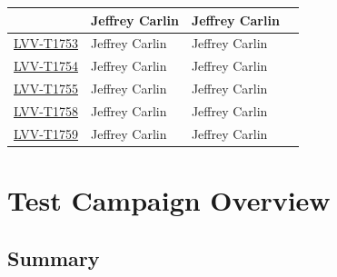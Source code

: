 \documentclass[DM,lsstdraft,STR,toc]{lsstdoc}
\begin{document}
\begin{longtable}{p{3cm}p{3cm}p{3cm}p{6cm}}
& {\small Jeffrey Carlin } & {\small Jeffrey Carlin } &
\begin{minipage}[]{6cm}
\smallskip
{\small  }
\medskip
\end{minipage}
\\ \hline
\href{https://jira.lsstcorp.org/secure/Tests.jspa#/testCase/LVV-T1753}{LVV-T1753}
& {\small Jeffrey Carlin } & {\small Jeffrey Carlin } &
\begin{minipage}[]{6cm}
\smallskip
{\small  }
\medskip
\end{minipage}
\\ \hline
\href{https://jira.lsstcorp.org/secure/Tests.jspa#/testCase/LVV-T1754}{LVV-T1754}
& {\small Jeffrey Carlin } & {\small Jeffrey Carlin } &
\begin{minipage}[]{6cm}
\smallskip
{\small  }
\medskip
\end{minipage}
\\ \hline
\href{https://jira.lsstcorp.org/secure/Tests.jspa#/testCase/LVV-T1755}{LVV-T1755}
& {\small Jeffrey Carlin } & {\small Jeffrey Carlin } &
\begin{minipage}[]{6cm}
\smallskip
{\small  }
\medskip
\end{minipage}
\\ \hline
\href{https://jira.lsstcorp.org/secure/Tests.jspa#/testCase/LVV-T1758}{LVV-T1758}
& {\small Jeffrey Carlin } & {\small Jeffrey Carlin } &
\begin{minipage}[]{6cm}
\smallskip
{\small  }
\medskip
\end{minipage}
\\ \hline
\href{https://jira.lsstcorp.org/secure/Tests.jspa#/testCase/LVV-T1759}{LVV-T1759}
& {\small Jeffrey Carlin } & {\small Jeffrey Carlin } &
\begin{minipage}[]{6cm}
\smallskip
{\small  }
\medskip
\end{minipage}
\\ \hline
\end{longtable}

\newpage

\section{Test Campaign Overview}
\label{sect:overview}

\subsection{Summary}
\label{sect:summarytable}
\end{document}
